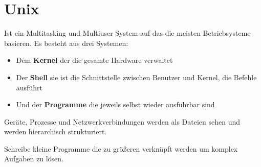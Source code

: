 \section*{Unix}

Ist ein Multitasking und Multiuser System auf das die meisten Betriebsysteme basieren.
Es besteht aus drei Systemen:

\begin{itemize}
  \item Dem \textbf{Kernel} der die gesamte Hardware verwaltet
  \item Der \textbf{Shell} sie ist die Schnittstelle zwischen Benutzer und Kernel, die Befehle ausführt
  \item Und der \textbf{Programme} die jeweils selbst wieder ausführbar sind
\end{itemize}

Geräte, Prozesse und Netzwerkverbindungen werden als Dateien sehen und werden hierarchisch strukturiert.

Schreibe kleine Programme die zu größeren verknüpft werden um komplex Aufgaben zu lösen.

